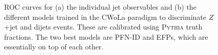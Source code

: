 \documentclass[letterpaper,11pt]{article}
\newcommand{\pythia}{\textsc{Pythia}\xspace}
\begin{document}
\clearpage

\begin{figure}[t]
\centering
{}
\caption{
%
ROC curves for (a) the individual jet observables and (b) the different models trained in the CWoLa paradigm to discriminate $Z$+jet and dijets events. 
%
These are calibrated using \pythia truth fractions.
%
The two best models are PFN-ID and EFPs, which are essentially on top of each other.
}
\label{fig:rocs}
\end{figure}



\end{document}
